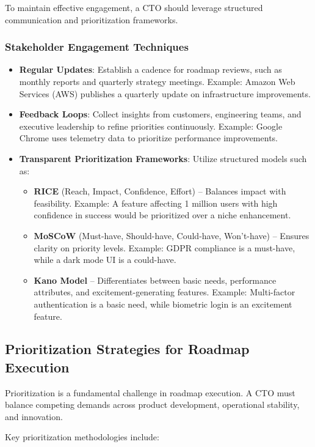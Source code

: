 To maintain effective engagement, a CTO should leverage structured communication and prioritization frameworks.

\subsubsection{Stakeholder Engagement Techniques}

\begin{itemize}
    \item \textbf{Regular Updates}: Establish a cadence for roadmap reviews, such as monthly reports and quarterly strategy meetings. Example: Amazon Web Services (AWS) publishes a quarterly update on infrastructure improvements.
    \item \textbf{Feedback Loops}: Collect insights from customers, engineering teams, and executive leadership to refine priorities continuously. Example: Google Chrome uses telemetry data to prioritize performance improvements.
    \item \textbf{Transparent Prioritization Frameworks}: Utilize structured models such as:
          \begin{itemize}
              \item \textbf{RICE} (Reach, Impact, Confidence, Effort) – Balances impact with feasibility. Example: A feature affecting 1 million users with high confidence in success would be prioritized over a niche enhancement.
              \item \textbf{MoSCoW} (Must-have, Should-have, Could-have, Won't-have) – Ensures clarity on priority levels. Example: GDPR compliance is a must-have, while a dark mode UI is a could-have.
              \item \textbf{Kano Model} – Differentiates between basic needs, performance attributes, and excitement-generating features. Example: Multi-factor authentication is a basic need, while biometric login is an excitement feature.
          \end{itemize}
\end{itemize}

\subsection{Prioritization Strategies for Roadmap Execution}
Prioritization is a fundamental challenge in roadmap execution. A CTO must balance competing demands across product development, operational stability, and innovation.

Key prioritization methodologies include:

